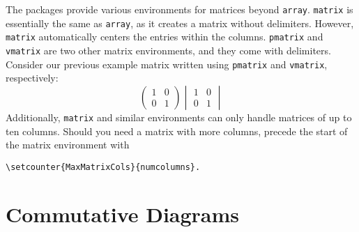 The \AmS{} packages provide various environments for matrices beyond
\verb_array_.  \verb_matrix_ is essentially the same as \verb_array_,
as it creates a matrix without delimiters.  However, \verb_matrix_
automatically centers the entries within the columns.  \verb_pmatrix_
and \verb_vmatrix_ are two other matrix environments, and they come
with delimiters.  Consider our previous example matrix written using
\verb_pmatrix_ and \verb_vmatrix_, respectively:
\[
\begin{pmatrix}
  1 & 0 \\
  0 & 1
\end{pmatrix}
\begin{vmatrix}
  1 & 0 \\
  0 & 1
\end{vmatrix}
\]
Additionally, \verb_matrix_ and similar environments can only handle
matrices of up to ten columns.  Should you need a matrix with more
columns, precede the start of the matrix environment with
\begin{verbatim}
\setcounter{MaxMatrixCols}{numcolumns}.
\end{verbatim}

\section{Commutative Diagrams}
\label{sec:commutative-diagrams}

